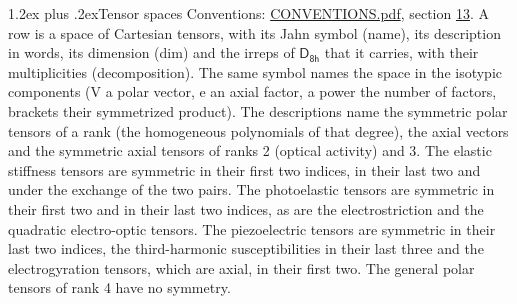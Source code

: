 \documentclass[10pt,a4paper]{article}
\makeatletter
\renewcommand\section{\@startsection{section}{1}{\z@}{-3ex plus -1ex minus -.2ex}%
  {1.2ex plus .2ex}{\normalfont\large\sffamily\bfseries\color{parttitle}}}
\numberwithin{equation}{section}
\newcommand{\grp}[1]{\mathsf{#1}}
\makeatother
\begin{document}
\section{Tensor spaces}\label{s:tensor_spaces}
Conventions: \href{../../CONVENTIONS.pdf}{CONVENTIONS.pdf}, section \href{../../CONVENTIONS.pdf\#conv.13}{13}.
\leavevmode\label{n:head.name}\label{n:head.description}\label{n:head.dim}\label{n:head.decomposition}A row is a space of Cartesian tensors, with its Jahn symbol (name), its description in words, its dimension (dim) and the irreps of $\grp{D_{8h}}$ that it carries, with their multiplicities (decomposition). \label{n:label.jahn}The same symbol names the space in the isotypic components (V a polar vector, e an axial factor, a power the number of factors, brackets their symmetrized product). The descriptions name the symmetric polar tensors of a rank (the homogeneous polynomials of that degree), the axial vectors and the symmetric axial tensors of ranks 2 (optical activity) and 3. The elastic stiffness tensors are symmetric in their first two indices, in their last two and under the exchange of the two pairs. The photoelastic tensors are symmetric in their first two and in their last two indices, as are the electrostriction and the quadratic electro-optic tensors. The piezoelectric tensors are symmetric in their last two indices, the third-harmonic susceptibilities in their last three and the electrogyration tensors, which are axial, in their first two. The general polar tensors of rank 4 have no symmetry.
\end{document}

